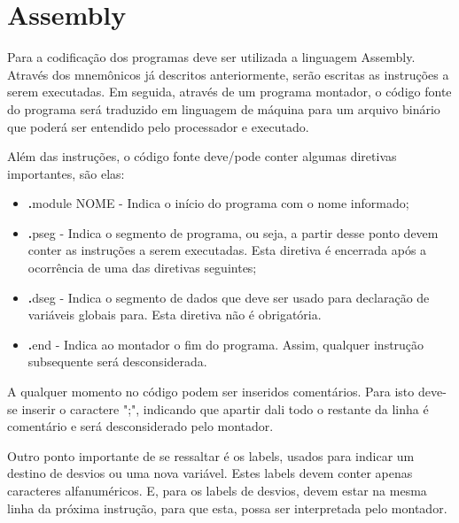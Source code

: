 \documentclass{report}
\begin{document}


\newpage
\section{Assembly}
Para a codificação dos programas deve ser utilizada a linguagem Assembly. Através dos mnemônicos já descritos anteriormente, serão escritas as instruções a serem executadas. Em seguida, através de um programa montador, o código fonte do programa será traduzido em linguagem de máquina para um arquivo binário que poderá ser entendido pelo processador e executado.\newline

Além das instruções, o código fonte deve/pode conter algumas diretivas importantes, são elas:

\begin{itemize}
\item \textbf .module NOME - Indica o início do programa com o nome informado;
\item \textbf .pseg - Indica o segmento de programa, ou seja, a partir desse ponto devem conter as instruções a serem executadas. Esta diretiva é encerrada após a ocorrência de uma das diretivas seguintes;
\item \textbf .dseg - Indica o segmento de dados que deve ser usado para declaração de variáveis globais para. Esta diretiva não é obrigatória.
\item \textbf .end - Indica ao montador o fim do programa. Assim, qualquer instrução subsequente será desconsiderada.
\end{itemize}

A qualquer momento no código podem ser inseridos comentários. Para isto deve-se inserir o caractere ";", indicando que apartir dali todo o restante da linha é comentário e será desconsiderado pelo montador.

Outro ponto importante de se ressaltar é os labels, usados para indicar um destino de desvios ou uma nova variável. Estes labels devem conter apenas caracteres alfanuméricos. E, para os labels de desvios, devem estar na mesma linha da próxima instrução, para que esta, possa ser interpretada pelo montador.
\end{document}
